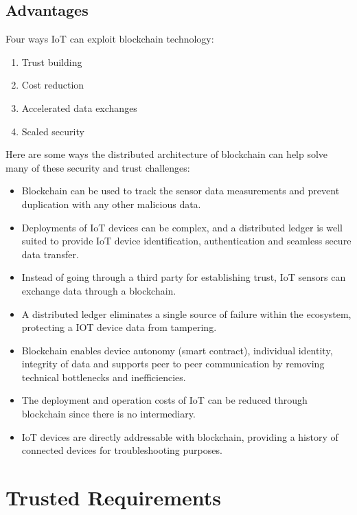 \section{Advantages}
Four ways IoT can exploit blockchain technology:
\begin{enumerate}
\item Trust building
\item Cost reduction
\item Accelerated data exchanges
\item Scaled security
\end{enumerate}
Here are some ways the distributed architecture of blockchain can help solve many of these security and trust challenges:
\begin{itemize}
\item Blockchain can be used to track the sensor data measurements and prevent duplication with any other malicious data.

\item Deployments of IoT devices can be complex, and a distributed ledger is well suited to provide IoT device identification, authentication and seamless secure data transfer.

\item Instead of going through a third party for establishing trust, IoT sensors can exchange data through a blockchain.

\item A distributed ledger eliminates a single source of failure within the ecosystem, protecting a IOT device data from tampering.

\item Blockchain enables device autonomy (smart contract), individual identity, integrity of data and supports peer to peer communication by removing technical bottlenecks and inefficiencies.

\item The deployment and operation costs of IoT can be reduced through blockchain since there is no intermediary.

\item IoT devices are directly addressable with blockchain, providing a history of connected devices for troubleshooting purposes.
\end{itemize}

\chapter{ Trusted Requirements}

